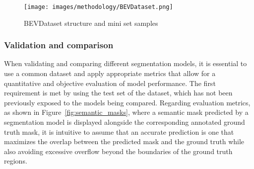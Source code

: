 \begin{figure}[h!]
    \centering
    \texttt{[image: images/methodology/BEVDataset.png]}
    \caption{BEVDataset structure and mini set samples}
    \label{fig:bev_dataset}
\end{figure}

\subsubsection{Validation and comparison}
When validating and comparing different segmentation models, it is essential to use a common dataset and apply appropriate metrics that allow for a quantitative and objective evaluation of model performance. The first requirement is met by using the test set of the dataset, which has not been previously exposed to the models being compared. Regarding evaluation metrics, as shown in Figure~\ref{fig:semantic_masks}, where a semantic mask predicted by a segmentation model is displayed alongside the corresponding annotated ground truth mask, it is intuitive to assume that an accurate prediction is one that maximizes the overlap between the predicted mask and the ground truth while also avoiding excessive overflow beyond the boundaries of the ground truth regions.


